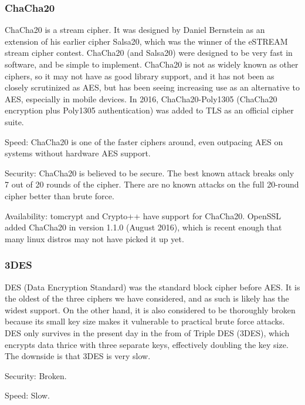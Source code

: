 \subsubsection{ ChaCha20 }

ChaCha20 \cite{chacha} is a stream cipher. It was designed by Daniel Bernstein as an extension of his earlier cipher Salsa20, which was the winner of the eSTREAM stream cipher contest.
ChaCha20 (and Salsa20) were designed to be very fast in software, and be simple to implement.
ChaCha20 is not as widely known as other ciphers, so it may not have as good library support, and it has not been as closely scrutinized as AES, but has been seeing increasing use as an alternative to AES, especially in mobile devices. In 2016, ChaCha20-Poly1305 (ChaCha20 encryption plus Poly1305 authentication) was added to TLS as an official cipher suite. \cite{rfc7905}

Speed: ChaCha20 is one of the faster ciphers around, even outpacing AES on systems without hardware AES support. \cite{eBACS}

Security: ChaCha20 is believed to be secure. The best known attack breaks only 7 out of 20 rounds of the cipher. There are no known attacks on the full 20-round cipher better than brute force.

Availability: tomcrypt and Crypto++ have support for ChaCha20. OpenSSL added ChaCha20 in version 1.1.0 (August 2016), which is recent enough that many linux distros may not have picked it up yet.

\subsubsection{ 3DES }

DES (Data Encryption Standard) was the standard block cipher before AES. It is the oldest of the three ciphers we have considered, and as such is likely has the widest support. On the other hand, it is also considered to be thoroughly broken because its small key size makes it vulnerable to practical brute force attacks. DES only survives in the present day in the from of Triple DES (3DES), which encrypts data thrice with three separate keys, effectively doubling the key size. The downside is that 3DES is very slow.

Security: Broken.

Speed: Slow.

